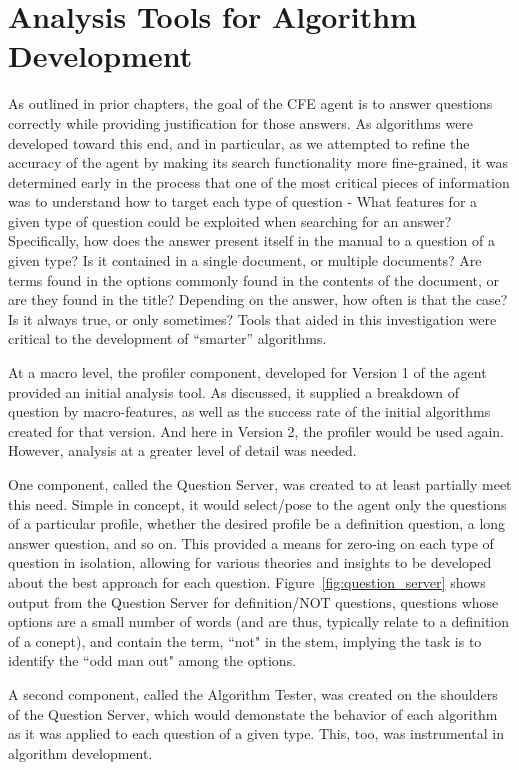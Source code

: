 \section{Analysis Tools for Algorithm Development}

As outlined in prior chapters, the goal of the CFE agent is to answer questions correctly while providing justification for those answers.  As algorithms were developed toward this end, and in particular, as we attempted to refine the accuracy of the agent by making its search functionality more fine-grained, it was determined early in the process that one of the most critical pieces of information was to understand how to target each type of question - What features for a given type of question could be exploited when searching for an answer?  Specifically, how does the answer present itself in the manual to a question of a given type?  Is it contained in a single document, or multiple documents?  Are terms found in the options commonly found in the contents of the document, or are they found in the title?  Depending on the answer, how often is that the case?  Is it always true, or only sometimes?  Tools that aided in this investigation were critical to the development of ``smarter'' algorithms.  

At a macro level, the profiler component, developed for Version 1 of the agent provided an initial analysis tool.  As discussed, it supplied a breakdown of question by macro-features, as well as the success rate of the initial algorithms created for that version.  And here in Version 2, the profiler would be used again.  However, analysis at a greater level of detail was needed.

One component, called the Question Server, was created to at least partially meet this need.  Simple in concept, it would select/pose to the agent only the questions of a particular profile, whether the desired profile be a definition question, a long answer question, and so on.  This provided a means for zero-ing on each type of question in isolation, allowing for various theories and insights to be developed about the best approach for each question.  Figure~\ref{fig:question_server} shows output from the Question Server for definition/NOT questions, questions whose options are a small number of words (and are thus, typically relate to a definition of a conept), and contain the term, ``not" in the stem, implying the task is to identify the ``odd man out" among the options.

A second component, called the Algorithm Tester, was created on the shoulders of the Question Server, which would demonstate the behavior of each algorithm as it was applied to each question of a given type.  This, too, was instrumental in algorithm development.

